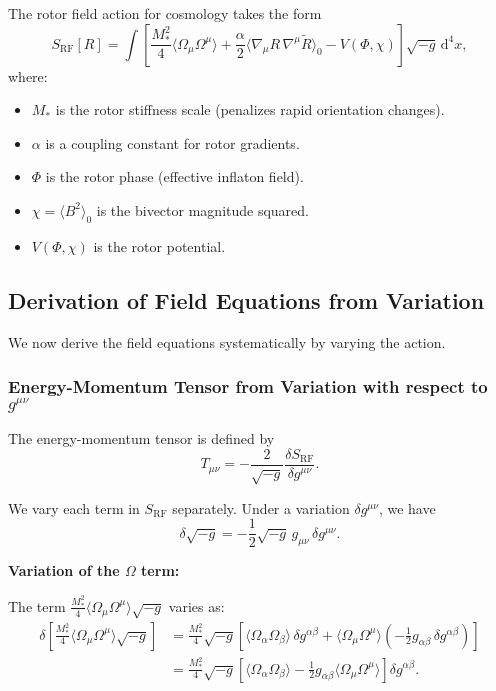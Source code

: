 \documentclass[11pt,a4paper]{article}
\numberwithin{equation}{section}
\theoremstyle{plain}
\theoremstyle{definition}
\theoremstyle{remark}
\newcommand{\dd}{\mathrm{d}}
\begin{document}
The rotor field action for cosmology takes the form
\begin{equation}
S_{\mathrm{RF}}[R] = \int \left[\frac{M_*^2}{4}\langle \Omega_\mu \Omega^\mu \rangle + \frac{\alpha}{2}\langle \nabla_\mu R\,\nabla^\mu \widetilde{R} \rangle_0 - V(\Phi,\chi)\right] \sqrt{-g}\, \dd^4x,
\label{eq:rf-action}
\end{equation}
where:
\begin{itemize}
  \item $M_*$ is the rotor stiffness scale (penalizes rapid orientation changes).
  \item $\alpha$ is a coupling constant for rotor gradients.
  \item $\Phi$ is the rotor phase (effective inflaton field).
  \item $\chi = \langle B^2 \rangle_0$ is the bivector magnitude squared.
  \item $V(\Phi,\chi)$ is the rotor potential.
\end{itemize}

\subsection{Derivation of Field Equations from Variation}

We now derive the field equations systematically by varying the action.

\subsubsection{Energy-Momentum Tensor from Variation with respect to $g^{\mu\nu}$}

The energy-momentum tensor is defined by
\begin{equation}
T_{\mu\nu} = -\frac{2}{\sqrt{-g}}\frac{\delta S_{\mathrm{RF}}}{\delta g^{\mu\nu}}.
\label{eq:Tmunu-def}
\end{equation}

We vary each term in $S_{\mathrm{RF}}$ separately. Under a variation $\delta g^{\mu\nu}$, we have
\begin{equation}
\delta\sqrt{-g} = -\frac{1}{2}\sqrt{-g}\,g_{\mu\nu}\,\delta g^{\mu\nu}.
\label{eq:sqrt-g-variation}
\end{equation}

\textbf{Variation of the $\Omega$ term:}

The term $\frac{M_*^2}{4}\langle \Omega_\mu \Omega^\mu \rangle\sqrt{-g}$ varies as:
\begin{align}
\delta\left[\frac{M_*^2}{4}\langle \Omega_\mu \Omega^\mu \rangle\sqrt{-g}\right] &= \frac{M_*^2}{4}\sqrt{-g}\left[\langle \Omega_\alpha \Omega_\beta \rangle\,\delta g^{\alpha\beta} + \langle \Omega_\mu \Omega^\mu \rangle\left(-\frac{1}{2}g_{\alpha\beta}\,\delta g^{\alpha\beta}\right)\right]\\
&= \frac{M_*^2}{4}\sqrt{-g}\left[\langle \Omega_\alpha \Omega_\beta \rangle - \frac{1}{2}g_{\alpha\beta}\langle \Omega_\mu \Omega^\mu \rangle\right]\delta g^{\alpha\beta}.
\end{align}
\end{document}
